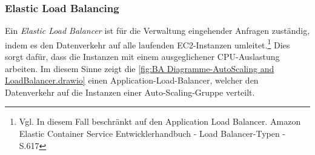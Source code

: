\subsubsection*{Elastic Load Balancing}
Ein \textit{Elastic Load Balancer} ist für die Verwaltung eingehender Anfragen zuständig, indem es den Datenverkehr auf alle laufenden EC2-Instanzen umleitet.\footnote{Vgl. In diesem Fall beschränkt auf den Application Load Balancer. Amazon Elastic Container Service Entwicklerhandbuch - Load Balancer-Typen - S.617\cite{AMZ39}} Dies sorgt dafür, dass die Instanzen mit einem ausgeglichener CPU-Auslastung arbeiten. Im diesem Sinne zeigt die \autoref{fig:BA Diagramme-AutoScaling and LoadBalancer.drawio} einen Application-Load-Balancer, welcher den Datenverkehr auf die Instanzen einer Auto-Scaling-Gruppe verteilt.

